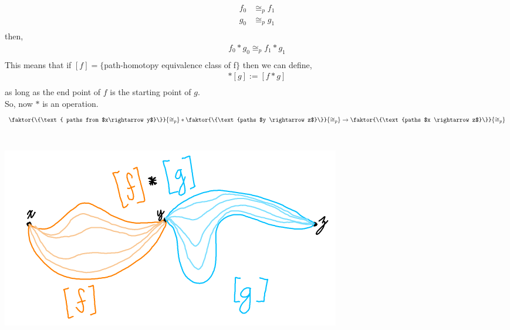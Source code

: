 \begin{itemize}
\begin{align*}
                f_0&\cong_{p}f_1\\
                g_0&\cong_{p}g_1\\
            \end{align*}
            then,
            \begin{align*}
                f_0*g_0\cong_{p}f_1*g_1\\
            \end{align*}
            This means that if $[f]=\{$path-homotopy equivalence class of f$\}$ then we can define,
            \begin{align*}
                [f]*[g]:=[f*g]\\
            \end{align*}
            as long as the end point of $f$ is the starting point of $g$.\\
            So, now $*$ is an operation.
            \begin{align*}
                \faktor{\{\text{ paths from $x\rightarrow y$}\}}{\cong_{p}}*\faktor{\{\text{paths $y \rightarrow z$}\}}{\cong_p}\rightarrow
                \faktor{\{\text{paths $x \rightarrow z$}\}}{\cong_{p}}\\
            \end{align*}\\
            \begin{minipage}[c]{\linewidth}
                \begin{center}
                    \includegraphics[width=\linewidth]{images/homotopy_class_concat.png}
                \end{center}
            \end{minipage}\\
            \begin{minipage}[c]{\linewidth}
                \begin{center}

\end{center}
\end{minipage}
\end{itemize}
